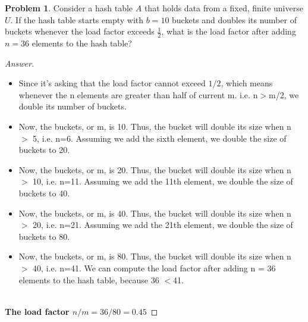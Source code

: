 \documentclass[11pt]{article}
\theoremstyle{definition}
\theoremstyle{definition}
\newtheorem{required}{Problem}
\theoremstyle{definition}
\begin{document}
\begin{required} \label{Hash2}
Consider a hash table $A$ that holds data from a fixed, finite universe $U$. If the hash table starts empty with $b=10$ buckets and doubles its number of buckets whenever the load factor exceeds $\frac{1}{2}$, what is the load factor after adding $n = 36$ elements to the hash table?
\end{required}

\begin{proof}[Answer]
\begin{itemize}
\item Since it's asking that the load factor cannot exceed $1/2$, which means whenever the n elements are greater than half of current m. i.e. n$>$m/2, we double its number of buckets.
\item Now, the buckets, or m, is 10. Thus, the bucket will double its size when n $>$ 5, i.e. n=6. Assuming we add the sixth element, we double the size of buckets to 20.
\item Now, the buckets, or m, is 20. Thus, the bucket will double its size when n $>$ 10, i.e. n=11. Assuming we add the 11th element, we double the size of buckets to 40.
\item Now, the buckets, or m, is 40. Thus, the bucket will double its size when n $>$ 20, i.e. n=21. Assuming we add the 21th element, we double the size of buckets to 80.
\item Now, the buckets, or m, is 80. Thus, the bucket will double its size when n $>$ 40, i.e. n=41. We can compute the load factor after adding n = 36 elements to the hash table, because 36 $<$41.
\end{itemize}
\textbf{\\The load factor $n/m = 36/80 = 0.45$ }
\end{proof}
\end{document}
